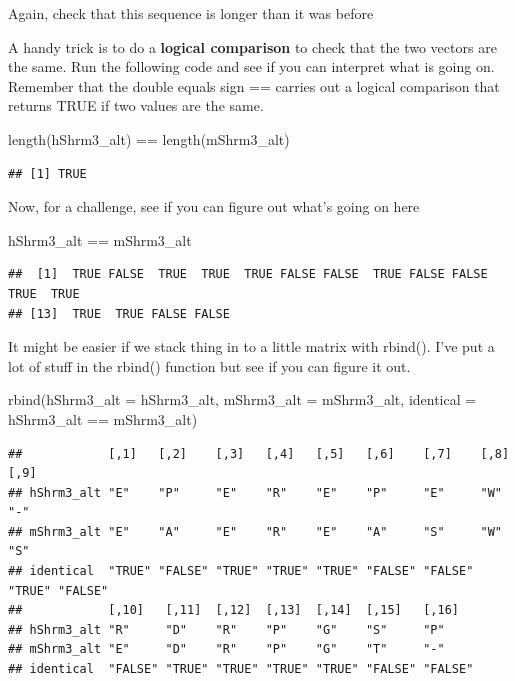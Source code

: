 \documentclass[
]{book}
\newenvironment{Shaded}{\begin{snugshade}}{\end{snugshade}}
\newcommand{\AttributeTok}[1]{\textcolor[rgb]{0.77,0.63,0.00}{#1}}
\newcommand{\FunctionTok}[1]{\textcolor[rgb]{0.00,0.00,0.00}{#1}}
\newcommand{\NormalTok}[1]{#1}
\newcommand{\SpecialCharTok}[1]{\textcolor[rgb]{0.00,0.00,0.00}{#1}}
\begin{document}
Again, check that this sequence is longer than it was before

A handy trick is to do a \textbf{logical comparison} to check that the two vectors are the same. Run the following code and see if you can interpret what is going on. Remember that the double equals sign == carries out a logical comparison that returns TRUE if two values are the same.

\begin{Shaded}
\begin{Highlighting}[]
\FunctionTok{length}\NormalTok{(hShrm3\_alt) }\SpecialCharTok{==} \FunctionTok{length}\NormalTok{(mShrm3\_alt)}
\end{Highlighting}
\end{Shaded}

\begin{verbatim}
## [1] TRUE
\end{verbatim}

Now, for a challenge, see if you can figure out what's going on here

\begin{Shaded}
\begin{Highlighting}[]
\NormalTok{hShrm3\_alt }\SpecialCharTok{==}\NormalTok{ mShrm3\_alt}
\end{Highlighting}
\end{Shaded}

\begin{verbatim}
##  [1]  TRUE FALSE  TRUE  TRUE  TRUE FALSE FALSE  TRUE FALSE FALSE  TRUE  TRUE
## [13]  TRUE  TRUE FALSE FALSE
\end{verbatim}

It might be easier if we stack thing in to a little matrix with rbind(). I've put a lot of stuff in the rbind() function but see if you can figure it out.

\begin{Shaded}
\begin{Highlighting}[]
\FunctionTok{rbind}\NormalTok{(}\AttributeTok{hShrm3\_alt =}\NormalTok{ hShrm3\_alt,}
      \AttributeTok{mShrm3\_alt =}\NormalTok{ mShrm3\_alt,}
      \AttributeTok{identical =}\NormalTok{ hShrm3\_alt }\SpecialCharTok{==}\NormalTok{ mShrm3\_alt)}
\end{Highlighting}
\end{Shaded}

\begin{verbatim}
##            [,1]   [,2]    [,3]   [,4]   [,5]   [,6]    [,7]    [,8]   [,9]   
## hShrm3_alt "E"    "P"     "E"    "R"    "E"    "P"     "E"     "W"    "-"    
## mShrm3_alt "E"    "A"     "E"    "R"    "E"    "A"     "S"     "W"    "S"    
## identical  "TRUE" "FALSE" "TRUE" "TRUE" "TRUE" "FALSE" "FALSE" "TRUE" "FALSE"
##            [,10]   [,11]  [,12]  [,13]  [,14]  [,15]   [,16]  
## hShrm3_alt "R"     "D"    "R"    "P"    "G"    "S"     "P"    
## mShrm3_alt "E"     "D"    "R"    "P"    "G"    "T"     "-"    
## identical  "FALSE" "TRUE" "TRUE" "TRUE" "TRUE" "FALSE" "FALSE"
\end{verbatim}
\end{document}
